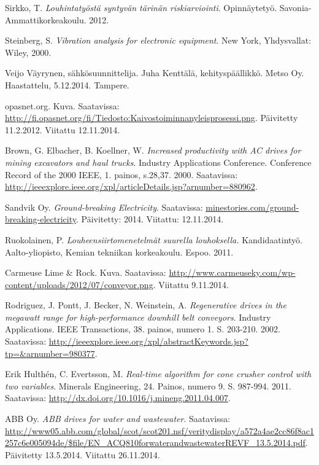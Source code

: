 \documentclass[finnish,12pt,a4paper,pdftex,elec,utf8]{aaltothesis}
\begin{document}
\begin{thebibliography}{99}
Sirkko, T. \textit{Louhintatyöstä syntyvän tärinän riskiarviointi}. Opinnäytetyö. Savonia-Ammattikorkeakoulu. 2012.

Steinberg, S. \textit{Vibration analysis for electronic equipment}. New York, Yhdysvallat: Wiley, 2000.

Veijo Väyrynen, sähkösuunnittelija. Juha Kenttälä, kehityspäällikkö. Metso Oy. Haastattelu, 5.12.2014. Tampere.

opasnet.org. Kuva. Saatavissa: \url{http://fi.opasnet.org/fi/Tiedosto:Kaivostoiminnanyleisprosessi.png}. Päivitetty 11.2.2012. Viitattu 12.11.2014.


Brown, G. Elbacher, B. Koellner, W. \textit{Increased productivity with AC drives for mining excavators and haul trucks}. Industry Applications Conference. Conference Record of the 2000 IEEE, 1. painos, s.28,37. 2000. Saatavissa: \url{http://ieeexplore.ieee.org/xpl/articleDetails.jsp?arnumber=880962}.

Sandvik Oy. \textit{Ground-breaking Electricity}. Saatavissa: \url{minestories.com/ground-breaking-electricity}. Päivitetty: 2014. Viitattu: 12.11.2014.

Ruokolainen, P. \textit{Louheensiirtomenetelmät suurella louhoksella.} Kandidaatintyö. Aalto-yliopisto, Kemian tekniikan korkeakoulu. Espoo. 2011.

Carmeuse Lime \& Rock. Kuva. Saatavissa: \url{http://www.carmeuseky.com/wp-content/uploads/2012/07/conveyor.png}. Viitattu 9.11.2014.

Rodriguez, J. Pontt, J. Becker, N. Weinstein, A. \textit{Regenerative drives in the megawatt range for high-performance downhill belt conveyors}. Industry Applications. IEEE Transactions, 38. painos, numero 1. S. 203-210. 2002. Saatavissa: \url{http://ieeexplore.ieee.org/xpl/abstractKeywords.jsp?tp=&arnumber=980377}.

Erik Hulthén, C. Evertsson, M. \textit{Real-time algorithm for cone crusher control with two variables}. Minerals Engineering, 24. Painos, numero 9. S. 987-994. 2011.  Saatavissa: \url{http://dx.doi.org/10.1016/j.mineng.2011.04.007}.

ABB Oy. \textit{ABB drives for water and wastewater}. Saatavissa: \url{http://www05.abb.com/global/scot/scot201.nsf/veritydisplay/a572a4ae2cc86f8ac1257c6e005094de/$file/EN_ACQ810forwaterandwastewaterREVF_13.5.2014.pdf}. Päivitetty 13.5.2014. Viitattu 26.11.2014.


\end{thebibliography}
\end{document}
